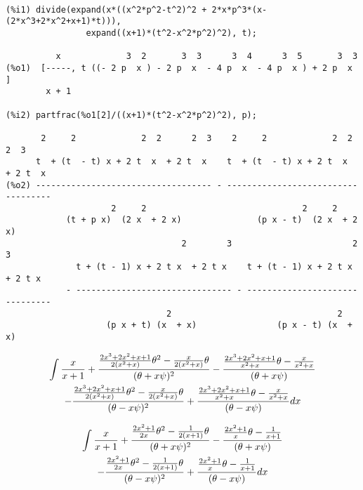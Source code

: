{\small\begin{verbatim}

(%i1) divide(expand(x*((x^2*p^2-t^2)^2 + 2*x*p^3*(x-(2*x^3+2*x^2+x+1)*t))),
                expand((x+1)*(t^2-x^2*p^2)^2), t);

          x             3  2       3  3      3  4      3  5       3  3
(%o1)  [-----, t ((- 2 p  x ) - 2 p  x  - 4 p  x  - 4 p  x ) + 2 p  x ]
        x + 1

(%i2) partfrac(%o1[2]/((x+1)*(t^2-x^2*p^2)^2), p);

       2     2             2  2      2  3    2     2             2  2      2  3
      t  + (t  - t) x + 2 t  x  + 2 t  x    t  + (t  - t) x + 2 t  x  + 2 t  x
(%o2) ----------------------------------- - -----------------------------------
                     2     2                               2     2
            (t + p x)  (2 x  + 2 x)               (p x - t)  (2 x  + 2 x)
                                   2        3                        2        3
              t + (t - 1) x + 2 t x  + 2 t x    t + (t - 1) x + 2 t x  + 2 t x
            - ------------------------------- - -------------------------------
                                2                                 2
                    (p x + t) (x  + x)                (p x - t) (x  + x)

\end{verbatim}}

\begin{multline*}
\int {x\over{x+1}} + \frac{\frac{2x^3 + 2x^2 + x +1}{2(x^2+x)}\theta^2 - \frac{x}{2(x^2+x)} \theta}{(\theta + x \psi)^2}
       - \frac{\frac{2x^3+2x^2+x+1}{x^2+x}\theta - \frac{x}{x^2+x}}{(\theta + x \psi)} \\
       - \frac{\frac{2x^3 + 2x^2 + x +1}{2(x^2+x)}\theta^2 - \frac{x}{2(x^2+x)} \theta}{(\theta - x \psi)^2}
       + \frac{\frac{2x^3+2x^2+x+1}{x^2+x}\theta - \frac{x}{x^2+x}}{(\theta - x \psi)} dx
\end{multline*}

\begin{multline*}
\int {x\over{x+1}} + \frac{\frac{2x^2 + 1}{2x}\theta^2 - \frac{1}{2(x+1)} \theta}{(\theta + x \psi)^2}
       - \frac{\frac{2x^2+1}{x}\theta - \frac{1}{x+1}}{(\theta + x \psi)} \\
       - \frac{\frac{2x^2 +1}{2x}\theta^2 - \frac{1}{2(x+1)} \theta}{(\theta - x \psi)^2}
       + \frac{\frac{2x^2+1}{x}\theta - \frac{1}{x+1}}{(\theta - x \psi)} dx
\end{multline*}

